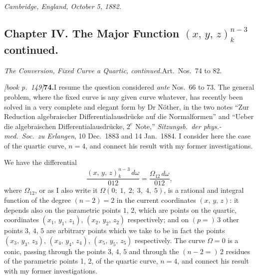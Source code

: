 \documentclass[11pt,a4paper]{article}
\theoremstyle{plain}
\theoremstyle{definition}
\theoremstyle{remark}
\begin{document}
\medskip
\begin{flushright}
\textit{Cambridge, England, October 5, 1882.}
\end{flushright}

\subsection*{Chapter IV. The Major Function $(x,\,y,\,z)^{n-3}_k$ continued.}

\medskip\noindent\textit{The Conversion, Fixed Curve a Quartic, continued.}\quad Art.\ Nos.\ 74 to 82.

\medskip\noindent\textit{[book p.~149]}\quad \textbf{74.}\quad I resume the question considered \textit{ante} Nos.\ 66 to 73. The general problem, where the fixed curve is any given curve whatever, has recently been solved in a very complete and elegant form by Dr Nöther, in the two notes ``Zur Reduction algebraischer Differentialausdrücke auf die Normalformen'' and ``Ueber die algebraischen Differentialausdrücke, $2^{e}$ Note,'' \textit{Sitzungsb.\ der phys.-med.\ Soc.\ zu Erlangen}, 10 Dec.\ 1883 and 14 Jan.\ 1884. I consider here the case of the quartic curve, $n = 4$, and connect his result with my former investigations.

We have the differential
\[
\frac{(x,\,y,\,z)^{n-3}_k\,d\omega}{012} = \frac{\Omega_{12}\,d\omega}{012},
\]
where $\Omega_{12}$, or as I also write it $\Omega(0;\;1,\;2;\;3,\;4,\;5)$, is a rational and integral function of the degree $(n - 2) = 2$ in the current coordinates $(x,\,y,\,z)$: it depends also on the parametric points $1$, $2$, which are points on the quartic, coordinates $(x_1,\,y_1,\,z_1)$, $(x_2,\,y_2,\,z_2)$ respectively; and on $(p = )\,3$ other points $3$, $4$, $5$ are arbitrary points which we take to be in fact the points $(x_3,\,y_3,\,z_3)$, $(x_4,\,y_4,\,z_4)$, $(x_5,\,y_5,\,z_5)$ respectively. The curve $\Omega = 0$ is a conic, passing through the points $3$, $4$, $5$ and through the $(n - 2 =)\,2$ residues of the parametric points 1, 2, of the quartic curve, $n = 4$, and connect his result with my former investigations.
\end{document}
